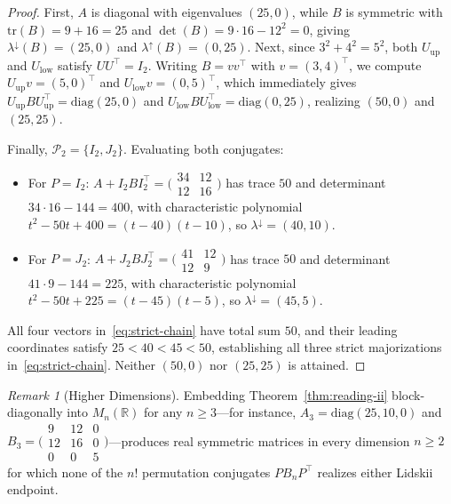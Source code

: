 \documentclass[11pt]{article}
\theoremstyle{definition}
\theoremstyle{remark}
\newtheorem{remark}[theorem]{Remark}
\newcommand{\R}{\mathbb{R}}
\newcommand{\Ptwo}{\mathcal{P}_2}
\newcommand{\diag}{\mathrm{diag}}
\newcommand{\tr}{\mathrm{tr}}
\begin{document}
\begin{proof}
First, $A$ is diagonal with eigenvalues $(25,0)$, while $B$ is symmetric with
$\tr(B) = 9 + 16 = 25$ and $\det(B) = 9\cdot 16 - 12^2 = 0$, giving
$\lambda^\downarrow(B) = (25,0)$ and $\lambda^\uparrow(B) = (0,25)$. Next, since
$3^2 + 4^2 = 5^2$, both $U_{\mathrm{up}}$ and $U_{\mathrm{low}}$ satisfy
$U U^\top = I_2$. Writing $B = v v^\top$ with $v = (3,4)^\top$, we compute
$U_{\mathrm{up}} v = (5,0)^\top$ and $U_{\mathrm{low}} v = (0,5)^\top$, which
immediately gives $U_{\mathrm{up}} B U_{\mathrm{up}}^\top = \diag(25,0)$ and
$U_{\mathrm{low}} B U_{\mathrm{low}}^\top = \diag(0,25)$, realizing $(50,0)$ and
$(25,25)$.

Finally, $\Ptwo = \{I_2, J_2\}$. Evaluating both conjugates:
\begin{itemize}
  \item For $P = I_2$: $A + I_2 B I_2^\top =
  \bigl(\begin{smallmatrix} 34 & 12 \\ 12 & 16 \end{smallmatrix}\bigr)$ has trace
  $50$ and determinant $34 \cdot 16 - 144 = 400$, with characteristic polynomial
  $t^2 - 50 t + 400 = (t - 40)(t - 10)$, so $\lambda^\downarrow = (40,10)$.
  \item For $P = J_2$: $A + J_2 B J_2^\top =
  \bigl(\begin{smallmatrix} 41 & 12 \\ 12 & 9 \end{smallmatrix}\bigr)$ has trace
  $50$ and determinant $41 \cdot 9 - 144 = 225$, with characteristic polynomial
  $t^2 - 50 t + 225 = (t - 45)(t - 5)$, so $\lambda^\downarrow = (45,5)$.
\end{itemize}
All four vectors in~\eqref{eq:strict-chain} have total sum $50$, and their leading
coordinates satisfy $25 < 40 < 45 < 50$, establishing all three strict
majorizations in~\eqref{eq:strict-chain}. Neither $(50,0)$ nor $(25,25)$ is
attained.
\end{proof}

\begin{remark}[Higher Dimensions]
Embedding Theorem~\ref{thm:reading-ii} block-diagonally into $M_n(\R)$ for any
$n \ge 3$---for instance, $A_3 = \diag(25,10,0)$ and
$B_3 = \bigl(\begin{smallmatrix} 9 & 12 & 0 \\ 12 & 16 & 0 \\ 0 & 0 & 5 \end{smallmatrix}\bigr)$---produces
real symmetric matrices in every dimension $n \ge 2$ for which none of the $n!$
permutation conjugates $P B_n P^\top$ realizes either Lidskii endpoint.
\end{remark}
\end{document}
